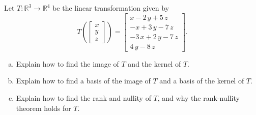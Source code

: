
\begin{exerciseStatement}
 Let \(T:\mathbb{R}^ 3  \to \mathbb{R}^ 4 \) be the linear transformation given by \[T\left(  \left[\begin{array}{c}
x \\
y \\
z
\end{array}\right]  \right) =  \left[\begin{array}{c}
x - 2 \, y + 5 \, z \\
-x + 3 \, y - 7 \, z \\
-3 \, x + 2 \, y - 7 \, z \\
4 \, y - 8 \, z
\end{array}\right] .\]
\begin{enumerate}[(a)]
\item Explain how to find the image of \(T\) and the kernel of \(T\).
\item Explain how to find a basis of the image of \(T\) and a basis of the kernel of \(T\).
\item Explain how to find the rank and nullity of \(T\), and why the rank-nullity theorem holds for \(T\).
\end{enumerate}
    
\end{exerciseStatement}
    
